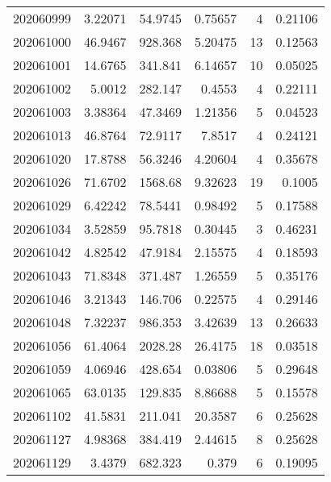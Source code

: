 \begin{tabular}{rrrrrr}
 202060999 &          3.22071 &       54.9745 &            0.75657 &           4 & 0.21106 \\
 202061000 &         46.9467  &      928.368  &            5.20475 &          13 & 0.12563 \\
 202061001 &         14.6765  &      341.841  &            6.14657 &          10 & 0.05025 \\
 202061002 &          5.0012  &      282.147  &            0.4553  &           4 & 0.22111 \\
 202061003 &          3.38364 &       47.3469 &            1.21356 &           5 & 0.04523 \\
 202061013 &         46.8764  &       72.9117 &            7.8517  &           4 & 0.24121 \\
 202061020 &         17.8788  &       56.3246 &            4.20604 &           4 & 0.35678 \\
 202061026 &         71.6702  &     1568.68   &            9.32623 &          19 & 0.1005  \\
 202061029 &          6.42242 &       78.5441 &            0.98492 &           5 & 0.17588 \\
 202061034 &          3.52859 &       95.7818 &            0.30445 &           3 & 0.46231 \\
 202061042 &          4.82542 &       47.9184 &            2.15575 &           4 & 0.18593 \\
 202061043 &         71.8348  &      371.487  &            1.26559 &           5 & 0.35176 \\
 202061046 &          3.21343 &      146.706  &            0.22575 &           4 & 0.29146 \\
 202061048 &          7.32237 &      986.353  &            3.42639 &          13 & 0.26633 \\
 202061056 &         61.4064  &     2028.28   &           26.4175  &          18 & 0.03518 \\
 202061059 &          4.06946 &      428.654  &            0.03806 &           5 & 0.29648 \\
 202061065 &         63.0135  &      129.835  &            8.86688 &           5 & 0.15578 \\
 202061102 &         41.5831  &      211.041  &           20.3587  &           6 & 0.25628 \\
 202061127 &          4.98368 &      384.419  &            2.44615 &           8 & 0.25628 \\
 202061129 &          3.4379  &      682.323  &            0.379   &           6 & 0.19095 \\

\end{tabular}
